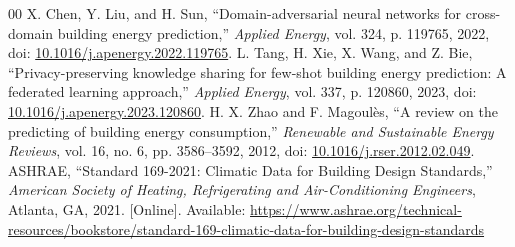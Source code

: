 \documentclass[conference]{IEEEtran}
\begin{document}
\begin{thebibliography}{00}
 X. Chen, Y. Liu, and H. Sun, ``Domain-adversarial neural networks for cross-domain building energy prediction,'' \textit{Applied Energy}, vol. 324, p. 119765, 2022, doi: \href{https://doi.org/10.1016/j.apenergy.2022.119765}{10.1016/j.apenergy.2022.119765}.
 L. Tang, H. Xie, X. Wang, and Z. Bie, ``Privacy-preserving knowledge sharing for few-shot building energy prediction: A federated learning approach,'' \textit{Applied Energy}, vol. 337, p. 120860, 2023, doi: \href{https://doi.org/10.1016/j.apenergy.2023.120860}{10.1016/j.apenergy.2023.120860}.
 H. X. Zhao and F. Magoul\`es, ``A review on the predicting of building energy consumption,'' \textit{Renewable and Sustainable Energy Reviews}, vol. 16, no. 6, pp. 3586--3592, 2012, doi: \href{https://doi.org/10.1016/j.rser.2012.02.049}{10.1016/j.rser.2012.02.049}.
 ASHRAE, ``Standard 169-2021: Climatic Data for Building Design Standards,'' \textit{American Society of Heating, Refrigerating and Air-Conditioning Engineers}, Atlanta, GA, 2021. [Online]. Available: \url{https://www.ashrae.org/technical-resources/bookstore/standard-169-climatic-data-for-building-design-standards}
\end{thebibliography}
\end{document}
